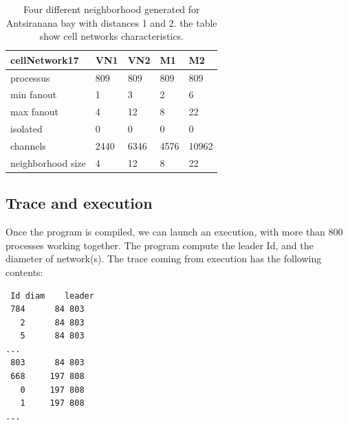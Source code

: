 \begin{table}[htb]
\begin{center}
\begin{tabular}{|l|l|l|l|l||}\hline
cellNetwork17 & VN1 &   VN2 &   M1 &    M2\\\hline
processus  &    809 &   809 &   809 &   809\\\hline
min fanout  &   1 &     3 &     2 &     6\\\hline
max fanout  &   4 &     12 &    8 &     22\\\hline
isolated    &   0 &     0 &     0 &     0\\\hline
channels    &   2440 &  6346 &  4576 &  10962\\\hline
neighborhood size  &   4 &  12 &  8 &  22\\\hline
\end{tabular}
\caption{ Four different neighborhood generated for Antsiranana bay with distances 1 and 2.
the table show  cell  networks characteristics. }
\label{tab:uneCATable}
\end{center}
\end{table}


\subsection{ Trace and execution }
\label{sec:antsiranan}

Once the program is compiled, we can launch an execution, with more than 800 processes
working together. The program compute the leader Id, and the diameter of network(s).
The trace coming from execution has the following contents:


\begin{lstlisting}
 Id	diam	leader
 784	  84 803
   2	  84 803
   5	  84 803
...
 803	  84 803
 668	 197 808
   0	 197 808
   1	 197 808
...
\end{lstlisting}

